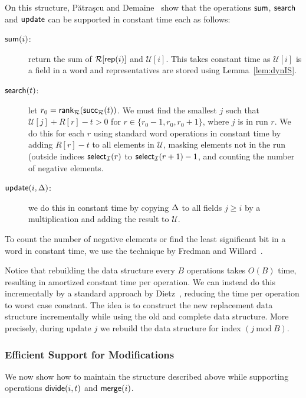 On this structure, Pătraşcu and Demaine~\cite{puaatracscu2004tight} show that the operations $\mathsf{sum}$, $\mathsf{search}$ and $\mathsf{update}$ can be supported in constant time each as follows:
\begin{description}
\item[$\mathsf{sum}(i)$:] return the sum of $\mathcal{R}[\mathsf{rep}(i)]$ and $\mathcal{U}[i]$. This takes constant time as $\mathcal{U}[i]$ is a field in a word and representatives are stored using Lemma~\ref{lem:dynIS}.
\item[$\mathsf{search}(t)$:] let $r_0 = \mathsf{rank}_\mathcal{R}(\mathsf{succ}_\mathcal{R}(t))$. We must find the smallest $j$ such that $\mathcal{U}[j] + R[r] - t > 0$ for $r \in \{r_0-1, r_0, r_0+1\}$, where $j$ is in run $r$.
We do this for each $r$ using standard word operations in constant time by adding $R[r]-t$ to all elements in $\mathcal{U}$, masking elements not in the run (outside indices $\mathsf{select}_\mathcal{I}(r)$ to $\mathsf{select}_\mathcal{I}(r+1)-1$, and counting the number of negative elements.
\item[$\mathsf{update}(i, \Delta)$:] we do this in constant time by copying $\Delta$ to all fields $j \geq i$ by a multiplication and adding the result to $\mathcal{U}$. 
\end{description}
To count the number of negative elements or find the least significant bit in a word in constant time, we use the technique by Fredman and Willard~\cite{fredmanwillardfusion}.

Notice that rebuilding the data structure every $B$ operations takes $O(B)$ time, resulting in amortized constant time per operation. We can instead do this incrementally by a standard approach by Dietz~\cite{dietz1989optimal}, reducing the time per operation to worst case constant. 
The idea is to construct the new replacement data structure incrementally while using the old and complete data structure. 
More precisely, during update $j$ we rebuild the data structure for index $(j~\mathrm{mod}~B)$.

\subsubsection{Efficient Support for Modifications}
We now show how to maintain the structure described above while supporting operations $\mathsf{divide}(i, t)$ and $\mathsf{merge}(i)$.

